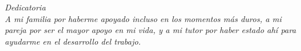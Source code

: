 
\thispagestyle{empty}
{}

\hfill
\vfill

\begin{flushright}
\itshape
Dedicatoria \\
A mi familia por haberme apoyado incluso en los momentos más duros, a mi pareja por ser el mayor apoyo en mi vida, y a mi tutor por haber estado ahí para ayudarme en el desarrollo del trabajo.
\end{flushright}

\vfill

\cleardoublepage
\endinput
